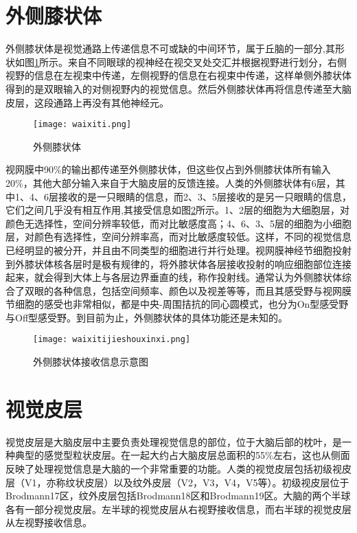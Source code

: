\documentclass[a4paper,10pt]{article}\large
\begin{document}
\section{外侧膝状体}

外侧膝状体是视觉通路上传递信息不可或缺的中间环节\cite{5:article}，属于丘脑的一部分,其形状如图\ref{fig 7}所示。来自不同眼球的视神经在视交叉处交汇并根据视野进行划分，右侧视野的信息在左视束中传递，左侧视野的信息在右视束中传递，这样单侧外膝状体得到的是双眼输入的对侧视野内的视觉信息。然后外侧膝状体再将信息传递至大脑皮层，这段通路上再没有其他神经元。

\begin{figure}[htb]
\centering
\texttt{[image: waixiti.png]}
\caption{外侧膝状体}\label{fig 7} 
\end{figure}


视网膜中90\%的输出都传递至外侧膝状体，但这些仅占到外侧膝状体所有输入20\%，其他大部分输入来自于大脑皮层的反馈连接\cite{13:misc}。人类的外侧膝状体有6层，其中1、4、6层接收的是一只眼睛的信息，而2、3、5层接收的是另一只眼睛的信息，它们之间几乎没有相互作用,其接受信息如图\ref{fig 8}所示。1、2层的细胞为大细胞层，对颜色无选择性，空间分辨率较低，而对比敏感度高；4、6、3、5层的细胞为小细胞层，对颜色有选择性，空间分辨率高，而对比敏感度较低。这样，不同的视觉信息已经明显的被分开，并且由不同类型的细胞进行并行处理。视网膜神经节细胞投射到外膝状体核各层时是极有规律的，将外膝状体各层接收投射的响应细胞部位连接起来，就会得到大体上与各层边界垂直的线，称作投射线。通常认为外侧膝状体综合了双眼的各种信息，包括空间频率、颜色以及视差等等，而且其感受野与视网膜节细胞的感受也非常相似，都是中央-周围拮抗的同心圆模式，也分为On型感受野与Off型感受野。到目前为止，外侧膝状体的具体功能还是未知的。

\begin{figure}[htb]
\centering
\texttt{[image: waixitijieshouxinxi.png]}
\caption{外侧膝状体接收信息示意图}\label{fig 8} 
\end{figure}

\section{视觉皮层}


视觉皮层是大脑皮层中主要负责处理视觉信息的部位，位于大脑后部的枕叶，是一种典型的感觉型粒状皮层。在一起大约占大脑皮层总面积的55\%左右，这也从侧面反映了处理视觉信息是大脑的一个非常重要的功能。人类的视觉皮层\cite{15:book}包括初级视皮层（V1，亦称纹状皮层）以及纹外皮层（V2，V3，V4，V5等）。初级视皮层位于Brodmann17区，纹外皮层包括Brodmann18区和Brodmann19区。大脑的两个半球各有一部分视觉皮层。左半球的视觉皮层从右视野接收信息，而右半球的视觉皮层从左视野接收信息\cite{12:book}。
\end{document}
